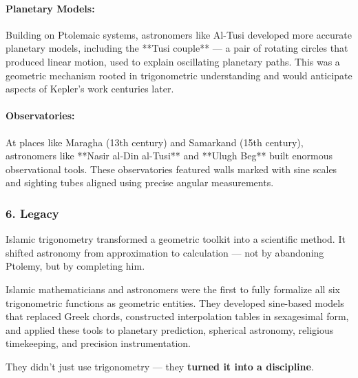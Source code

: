 \paragraph{Planetary Models:} Building on Ptolemaic systems, astronomers like Al-Tusi developed more accurate planetary models, including the **Tusi couple** — a pair of rotating circles that produced linear motion, used to explain oscillating planetary paths. This was a geometric mechanism rooted in trigonometric understanding and would anticipate aspects of Kepler's work centuries later.

\paragraph{Observatories:} At places like Maragha (13th century) and Samarkand (15th century), astronomers like **Nasir al-Din al-Tusi** and **Ulugh Beg** built enormous observational tools. These observatories featured walls marked with sine scales and sighting tubes aligned using precise angular measurements.

\subsubsection*{6. Legacy}

Islamic trigonometry transformed a geometric toolkit into a scientific method. It shifted astronomy from approximation to calculation — not by abandoning Ptolemy, but by completing him.

\medskip

\begin{tcolorbox}[colback=gray!5!white, colframe=black, title=\textbf{TL;DR: When Trigonometry Became a Science}, fonttitle=\bfseries, arc=1.5mm, boxrule=0.4pt]
Islamic mathematicians and astronomers were the first to fully formalize all six trigonometric functions as geometric entities. They developed sine-based models that replaced Greek chords, constructed interpolation tables in sexagesimal form, and applied these tools to planetary prediction, spherical astronomy, religious timekeeping, and precision instrumentation.

They didn’t just use trigonometry — they \textbf{turned it into a discipline}.
\end{tcolorbox}

